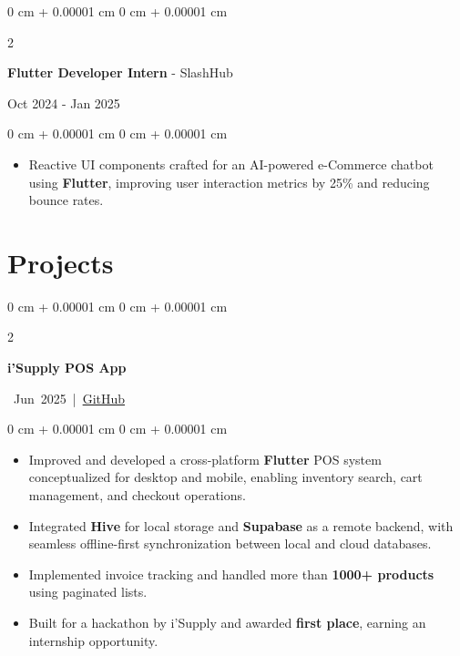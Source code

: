 \documentclass[10pt, letterpaper]{article}
\newenvironment{highlights}{
\begin{itemize}[
topsep=0.10 cm,
parsep=0.10 cm,
partopsep=0pt,
itemsep=0pt,
leftmargin=0 cm + 10pt
]
}{
\end{itemize}
} %
\newenvironment{onecolentry}{
\begin{adjustwidth}{
0 cm + 0.00001 cm
}{
0 cm + 0.00001 cm
}
}{
\end{adjustwidth}
} %
\newenvironment{twocolentry}[2][]{
\onecolentry
\def\secondColumn{#2}
\setcolumnwidth{\fill, 4.5 cm}
\begin{paracol}{2}
}{
\switchcolumn \raggedleft \secondColumn
\end{paracol}
\endonecolentry
} %
\let\hrefWithoutArrow\href
\begin{document}
\vspace{0.2 cm}

\begin{twocolentry}{
Oct 2024 - Jan 2025
}
\textbf{\large Flutter Developer Intern} - SlashHub
\end{twocolentry}
\vspace{0.1 cm}
\begin{onecolentry}
\begin{highlights}
\item Reactive UI components crafted for an AI-powered e-Commerce chatbot using \textbf{Flutter}, improving user interaction metrics by 25\% and reducing bounce rates.
\end{highlights}
\end{onecolentry}

\newpage


\section{Projects}

\vspace{0.10 cm}

\begin{twocolentry}{
\mbox{
Jun 2025 | \hrefWithoutArrow{https://github.com/KarimmYasser/isupply_app}{GitHub}}%
}
\textbf{i'Supply POS App}
\end{twocolentry}

\vspace{0.20 cm}

\begin{onecolentry}
\begin{highlights}
\item Improved and developed a cross-platform \textbf{Flutter} POS system conceptualized for desktop and mobile, enabling inventory search, cart management, and checkout operations.
\item Integrated \textbf{Hive} for local storage and \textbf{Supabase} as a remote backend, with seamless offline-first synchronization between local and cloud databases.
\item Implemented invoice tracking and handled more than \textbf{1000+ products} using paginated lists.
\item Built for a hackathon by i'Supply and awarded \textbf{first place}, earning an internship opportunity.
\end{highlights}
\end{onecolentry}

\vspace{0.2 cm}
\end{document}
